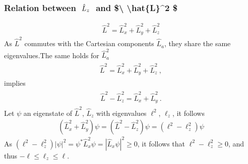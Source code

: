 \documentclass[letterpaper,10pt,english]{jupyterBook}
\begin{document}
\subsubsection*{Relation between \protect\(\ \hat{L}_z\ \protect\) and \$\textbackslash{} \textbackslash{}hat\{L\}\textasciicircum{}2 \$}
\begin{equation*}
\begin{split}\hat{L}^2 = \hat{L}_x^2 + \hat{L}_y^2 + \hat{L}_z^2\end{split}
\end{equation*}
\sphinxAtStartPar
As \(\hat{L}^2\) commutes with the Cartesian components \(\hat{L}_a\), they share the same eigenvalues.The same holds for \(\hat{L}_a^2\)
\begin{equation*}
\begin{split}\begin{aligned}
  \hat{L}^2 = \hat{L}_x^2 + \hat{L}_y^2 + \hat{L}_z^2  \ ,
\end{aligned}\end{split}
\end{equation*}
\sphinxAtStartPar
implies
\begin{equation*}
\begin{split}\begin{aligned}
  \hat{L}^2 - \hat{L}_z^2 = \hat{L}_x^2 + \hat{L}_y^2  \ .
\end{aligned}\end{split}
\end{equation*}
\sphinxAtStartPar
Let \(\psi\) an eigenstate of \(\hat{L}^2\), \(\hat{L}_z\) with eigenvalues \(\ell^2\), \(\ell_z\), it follows
\begin{equation*}
\begin{split}\left( \hat{L}_x^2 + \hat{L}_y^2 \right) \psi = \left( \hat{L}^2 - \hat{L}_z^2 \right) \psi = \left( \ell^2 - \ell_z^2 \right) \psi\end{split}
\end{equation*}
\sphinxAtStartPar
As \(( \ell^2 -  \ell_z^2 ) | \psi |^2 = \psi^* \hat{L}^2_x \psi = | \hat{L}_x \psi |^2 \ge 0\), it follows that \(\ell^2 - \ell^2_z \ge 0\), and thus \(-\ell \le \ell_z \le \ell\).
\end{document}
